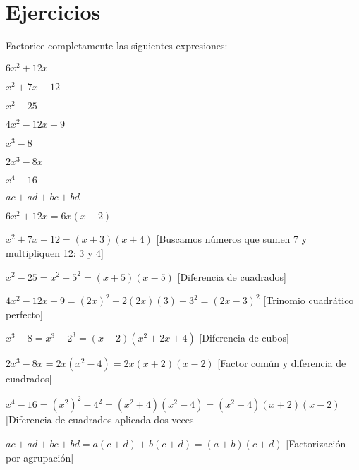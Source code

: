 
\section{Ejercicios}

\begin{exercise}
\problem Factorice completamente las siguientes expresiones:

\begin{exerciselist}
    \item $6x^2 + 12x$
    \item $x^2 + 7x + 12$
    \item $x^2 - 25$
    \item $4x^2 - 12x + 9$
    \item $x^3 - 8$
    \item $2x^3 - 8x$
    \item $x^4 - 16$
    \item $ac + ad + bc + bd$
\end{exerciselist}

\begin{solucion}
\begin{exerciselist}
    \item $6x^2 + 12x = 6x(x + 2)$
    
    \item $x^2 + 7x + 12 = (x + 3)(x + 4)$ [Buscamos números que sumen 7 y multipliquen 12: 3 y 4]
    
    \item $x^2 - 25 = x^2 - 5^2 = (x + 5)(x - 5)$ [Diferencia de cuadrados]
    
    \item $4x^2 - 12x + 9 = (2x)^2 - 2(2x)(3) + 3^2 = (2x - 3)^2$ [Trinomio cuadrático perfecto]
    
    \item $x^3 - 8 = x^3 - 2^3 = (x - 2)(x^2 + 2x + 4)$ [Diferencia de cubos]
    
    \item $2x^3 - 8x = 2x(x^2 - 4) = 2x(x + 2)(x - 2)$ [Factor común y diferencia de cuadrados]
    
    \item $x^4 - 16 = (x^2)^2 - 4^2 = (x^2 + 4)(x^2 - 4) = (x^2 + 4)(x + 2)(x - 2)$ [Diferencia de cuadrados aplicada dos veces]
    
    \item $ac + ad + bc + bd = a(c + d) + b(c + d) = (a + b)(c + d)$ [Factorización por agrupación]
\end{exerciselist}
\end{solucion}
\end{exercise}

